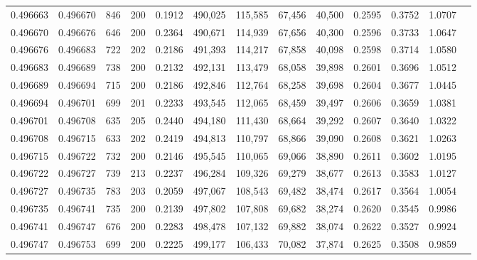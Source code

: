 \begin{tabular}{rrrrrrrrrrrrr}
0.496663 & 0.496670 &   846 & 200 &                                     0.1912 & 490,025 & 115,585 &  67,456 &  40,500 & 0.2595 & 0.3752 & 1.0707 \\
0.496670 & 0.496676 &   646 & 200 &                                     0.2364 & 490,671 & 114,939 &  67,656 &  40,300 & 0.2596 & 0.3733 & 1.0647 \\
0.496676 & 0.496683 &   722 & 202 &                                     0.2186 & 491,393 & 114,217 &  67,858 &  40,098 & 0.2598 & 0.3714 & 1.0580 \\
0.496683 & 0.496689 &   738 & 200 &                                     0.2132 & 492,131 & 113,479 &  68,058 &  39,898 & 0.2601 & 0.3696 & 1.0512 \\
0.496689 & 0.496694 &   715 & 200 &                                     0.2186 & 492,846 & 112,764 &  68,258 &  39,698 & 0.2604 & 0.3677 & 1.0445 \\
0.496694 & 0.496701 &   699 & 201 &                                     0.2233 & 493,545 & 112,065 &  68,459 &  39,497 & 0.2606 & 0.3659 & 1.0381 \\
0.496701 & 0.496708 &   635 & 205 &                                     0.2440 & 494,180 & 111,430 &  68,664 &  39,292 & 0.2607 & 0.3640 & 1.0322 \\
0.496708 & 0.496715 &   633 & 202 &                                     0.2419 & 494,813 & 110,797 &  68,866 &  39,090 & 0.2608 & 0.3621 & 1.0263 \\
0.496715 & 0.496722 &   732 & 200 &                                     0.2146 & 495,545 & 110,065 &  69,066 &  38,890 & 0.2611 & 0.3602 & 1.0195 \\
0.496722 & 0.496727 &   739 & 213 &                                     0.2237 & 496,284 & 109,326 &  69,279 &  38,677 & 0.2613 & 0.3583 & 1.0127 \\
0.496727 & 0.496735 &   783 & 203 &                                     0.2059 & 497,067 & 108,543 &  69,482 &  38,474 & 0.2617 & 0.3564 & 1.0054 \\
0.496735 & 0.496741 &   735 & 200 &                                     0.2139 & 497,802 & 107,808 &  69,682 &  38,274 & 0.2620 & 0.3545 & 0.9986 \\
0.496741 & 0.496747 &   676 & 200 &                                     0.2283 & 498,478 & 107,132 &  69,882 &  38,074 & 0.2622 & 0.3527 & 0.9924 \\
0.496747 & 0.496753 &   699 & 200 &                                     0.2225 & 499,177 & 106,433 &  70,082 &  37,874 & 0.2625 & 0.3508 & 0.9859 \\

\end{tabular}
